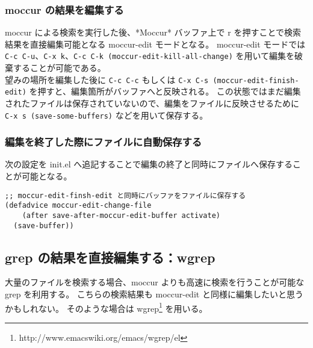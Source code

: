 \subsubsection{moccur の結果を編集する}
moccur による検索を実行した後、*Moccur* バッファ上で r を押すことで検索結果を直接編集可能となる moccur-edit モードとなる。
moccur-edit モードでは \texttt{C-c C-u}、\texttt{C-x k}、\texttt{C-c C-k (moccur-edit-kill-all-change)} を用いて編集を破棄することが可能である。\\

望みの場所を編集した後に \texttt{C-c C-c} もしくは \texttt{C-x C-s (moccur-edit-finish-edit)} を押すと、編集箇所がバッファへと反映される。
この状態ではまだ編集されたファイルは保存されていないので、編集をファイルに反映させるために \texttt{C-x s (save-some-buffers)} などを用いて保存する。
\subsubsection{編集を終了した際にファイルに自動保存する}
次の設定を init.el へ追記することで編集の終了と同時にファイルへ保存することが可能となる。
\begin{mdframed}[roundcorner=0.50zw,leftmargin=3.00zw,rightmargin=3.00zw,skipabove=0.40zw,skipbelow=0.40zw,innertopmargin=4.00pt,innerbottommargin=4.00pt,innerleftmargin=5.00pt,innerrightmargin=5.00pt,linecolor=gray!020,linewidth=0.50pt,backgroundcolor=gray!20]
\begin{verbatim}
;; moccur-edit-finsh-edit と同時にバッファをファイルに保存する
(defadvice moccur-edit-change-file
    (after save-after-moccur-edit-buffer activate)
  (save-buffer))
\end{verbatim}
\end{mdframed}
\subsection{grep の結果を直接編集する：wgrep}
大量のファイルを検索する場合、moccur よりも高速に検索を行うことが可能な grep を利用する。
こちらの検索結果も moccur-edit と同様に編集したいと思うかもしれない。
そのような場合は wgrep\footnote{http://www.emacswiki.org/emacs/wgrep/el} を用いる。
